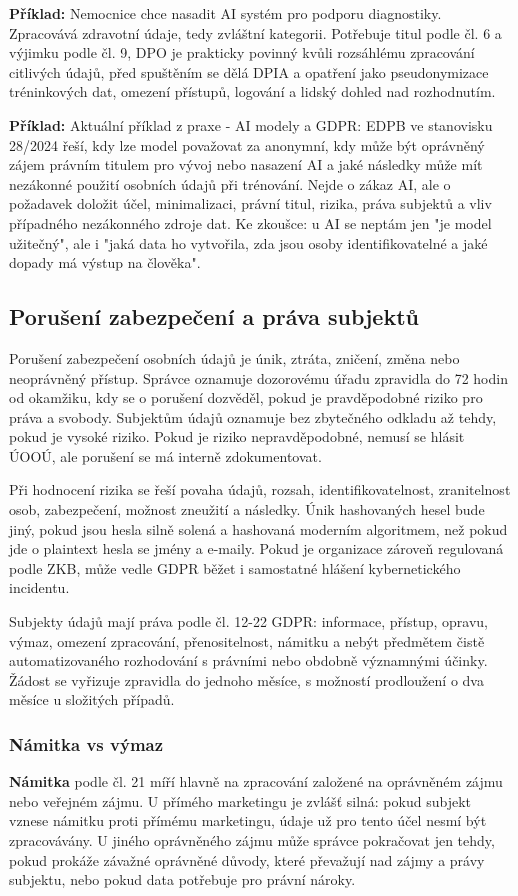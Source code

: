 \documentclass[11pt,a4paper]{article}
\newcommand{\priklad}[1]{\begin{tcolorbox}[breakable,enhanced,colback=green!7,colframe=green!30!black,boxrule=0pt,arc=1mm,left=5pt,right=5pt,top=5pt,bottom=5pt,before skip=6pt,after skip=6pt]\textbf{Příklad:} #1\end{tcolorbox}}
\begin{document}
\priklad{Nemocnice chce nasadit AI systém pro podporu diagnostiky. Zpracovává zdravotní údaje, tedy zvláštní kategorii. Potřebuje titul podle čl. 6 a výjimku podle čl. 9, DPO je prakticky povinný kvůli rozsáhlému zpracování citlivých údajů, před spuštěním se dělá DPIA a opatření jako pseudonymizace tréninkových dat, omezení přístupů, logování a lidský dohled nad rozhodnutím.}

\priklad{Aktuální příklad z praxe - AI modely a GDPR: EDPB ve stanovisku 28/2024 řeší, kdy lze model považovat za anonymní, kdy může být oprávněný zájem právním titulem pro vývoj nebo nasazení AI a jaké následky může mít nezákonné použití osobních údajů při trénování. Nejde o zákaz AI, ale o požadavek doložit účel, minimalizaci, právní titul, rizika, práva subjektů a vliv případného nezákonného zdroje dat. Ke zkoušce: u AI se neptám jen "je model užitečný", ale i "jaká data ho vytvořila, zda jsou osoby identifikovatelné a jaké dopady má výstup na člověka".}

\subsection*{Porušení zabezpečení a práva subjektů}
Porušení zabezpečení osobních údajů je únik, ztráta, zničení, změna nebo neoprávněný přístup. Správce oznamuje dozorovému úřadu zpravidla do 72 hodin od okamžiku, kdy se o porušení dozvěděl, pokud je pravděpodobné riziko pro práva a svobody. Subjektům údajů oznamuje bez zbytečného odkladu až tehdy, pokud je vysoké riziko. Pokud je riziko nepravděpodobné, nemusí se hlásit ÚOOÚ, ale porušení se má interně zdokumentovat.

Při hodnocení rizika se řeší povaha údajů, rozsah, identifikovatelnost, zranitelnost osob, zabezpečení, možnost zneužití a následky. Únik hashovaných hesel bude jiný, pokud jsou hesla silně solená a hashovaná moderním algoritmem, než pokud jde o plaintext hesla se jmény a e-maily. Pokud je organizace zároveň regulovaná podle ZKB, může vedle GDPR běžet i samostatné hlášení kybernetického incidentu.

Subjekty údajů mají práva podle čl. 12-22 GDPR: informace, přístup, opravu, výmaz, omezení zpracování, přenositelnost, námitku a nebýt předmětem čistě automatizovaného rozhodování s právními nebo obdobně významnými účinky. Žádost se vyřizuje zpravidla do jednoho měsíce, s možností prodloužení o dva měsíce u složitých případů.

\subsubsection*{Námitka vs výmaz}
\textbf{Námitka} podle čl. 21 míří hlavně na zpracování založené na oprávněném zájmu nebo veřejném zájmu. U přímého marketingu je zvlášť silná: pokud subjekt vznese námitku proti přímému marketingu, údaje už pro tento účel nesmí být zpracovávány. U jiného oprávněného zájmu může správce pokračovat jen tehdy, pokud prokáže závažné oprávněné důvody, které převažují nad zájmy a právy subjektu, nebo pokud data potřebuje pro právní nároky.
\end{document}
